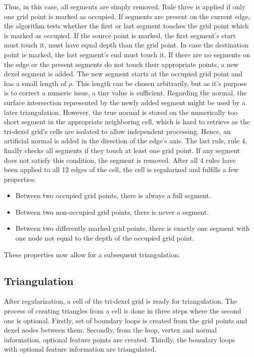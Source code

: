 Thus, in this case, all segments are simply removed.
%
Rule three is applied if only one grid point is marked as occupied.
If segments are present on the current edge, the algorithm tests whether the first or last segment touches the grid point which is marked as occupied.
If the source point is marked, the first segment's start must touch it, \ie must have equal depth than the grid point.
In case the destination point is marked, the last segment's end must touch it.
If there are no segments on the edge or the present segments do not touch their appropriate points, a new dexel segment is added.
The new segment starts at the occupied grid point and has a small length of $\rho$.
This length can be chosen arbitrarily, but as it's purpose is to correct a numeric issue, a tiny value is sufficient.
Regarding the normal, the surface intersection represented by the newly added segment might be used by a later triangulation.
However, the true normal is stored on the numerically too short segment in the appropriate neighboring cell, which is hard to retrieve as the tri-dexel grid's cells are isolated to allow independent processing.
Hence, an artificial normal is added in the direction of the edge's axis.
%
The last rule, rule 4, finally checks all segments if they touch at least one grid point.
If any segment does not satisfy this condition, the segment is removed.
%
After all 4 rules have been applied to all 12 edges of the cell, the cell is regularized and fulfills a few properties:
\begin{itemize}
	\item Between two occupied grid points, there is always a full segment.
	\item Between two non-occupied grid points, there is never a segment.
	\item Between two differently marked grid points, there is exactly one segment with one node not equal to the depth of the occupied grid point.
\end{itemize}
These properties now allow for a subsequent triangulation.


\subsection{Triangulation}
\label{sec:tri_dexel_triangulation}

After regularization, a cell of the tri-dexel grid is ready for triangulation.
The process of creating triangles from a cell is done in three steps where the second one is optional.
Firstly, set of boundary loops is created from the grid points and dexel nodes between them.
Secondly, from the loop, vertex and normal information, optional feature points are created.
Thirdly, the boundary loops with optional feature information are triangulated.

